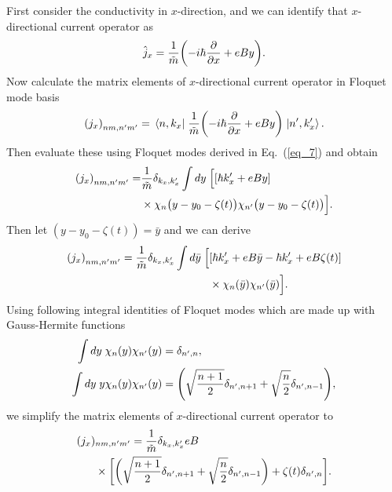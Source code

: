 First consider the conductivity in $x$-direction, and we can identify that $x$-directional current operator as
\begin{equation} \label{eq_d4}
  \hat{j}_x = \frac{1}{\tilde{m}} \qty(-i\hbar\pdv{x} + eBy).
\end{equation}
Now calculate the matrix elements of $x$-directional current operator in Floquet mode basis
\begin{equation} \label{eq_d5}
  \qty({j}_x)_{nm,n'm'} =
  \mel{n,k_x}{\;\frac{1}{\tilde{m}} \qty(-i\hbar\pdv{x} + eBy)\;}{n',k'_x}.
\end{equation}
Then evaluate these using Floquet modes derived in Eq.~(\ref{eq_7}) and obtain
\begin{equation} \label{eq_d6}
  \begin{aligned}
    \qty({j}_x)_{nm,n'm'} = &
    \frac{1}{{\tilde{m}}}
    \delta_{k_x,k'_x}
    \int dy \;
    \Big[
    \qty[\hbar k'_x + eBy] \\
    & \times
     \chi_{n}\big(y - y_0 - \zeta(t)\big)
    \chi_{n'}\big(y - y_0 - \zeta(t)\big)
    \Big].
  \end{aligned}
\end{equation}
Then let $(y - y_0 - \zeta(t)) = \bar{y}$ and we can derive
\begin{equation} \label{eq_d7}
  \begin{aligned}
    \qty({j}_x)_{nm,n'm'} =
    \frac{1}{{\tilde{m}}}
    \delta_{k_x,k'_x}
    \int d\bar{y} \;
    \Big[ &
    \qty[\hbar k'_x + eB\bar{y} -\hbar k'_x + eB\zeta(t)] \\
    & \times
    \chi_{n}(\bar{y})
    \chi_{n'}(\bar{y})
    \Big].
  \end{aligned}
\end{equation}
Using following integral identities of Floquet modes which are made up with  Gauss-Hermite functions \cite{vedenyapin11,szego59}
\begin{subequations} \label{eq_d8}
  \begin{align}
    \int d{y} \;
    \chi_{n}({y})
    \chi_{n'}({y}) &=
    \delta_{n',n}, \\
    \int dy \;
    y
    \chi_{n}({y})
    \chi_{n'}({y}) &=
    \qty(\sqrt{\frac{n+1}{2}} \delta_{n',n+1} + \sqrt{\frac{n}{2}}
    \delta_{n',n-1}),
  \end{align}
\end{subequations}
we simplify the matrix elements of $x$-directional current operator to
\begin{equation} \label{eq_d9}
  \begin{aligned}
    \qty({j}_x)&_{nm,n'm'} =
    \frac{1}{{\tilde{m}}}
    \delta_{k_x,k'_x}
    eB\\
    & \times
    \bigg[
    \bigg(\sqrt{\frac{n+1}{2}} \delta_{n',n+1} + \sqrt{\frac{n}{2}}
    \delta_{n',n-1}\bigg)
    + \zeta(t) \delta_{n',n}
    \bigg].
  \end{aligned}
\end{equation}


